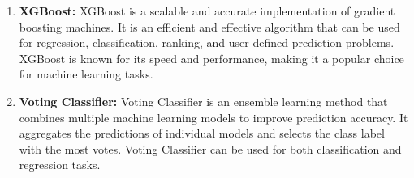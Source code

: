 \documentclass[12pt]{report}
\begin{document}
\begin{enumerate}
\item{\textbf{XGBoost: }}
XGBoost is a scalable and accurate implementation of gradient boosting machines. It is an efficient and effective algorithm that can be used for regression, classification, ranking, and user-defined prediction problems. XGBoost is known for its speed and performance, making it a popular choice for machine learning tasks. \cite{hadsonml}
\item{\textbf{Voting Classifier: }}
Voting Classifier is an ensemble learning method that combines multiple machine learning models to improve prediction accuracy. It aggregates the predictions of individual models and selects the class label with the most votes. Voting Classifier can be used for both classification and regression tasks. \cite{hadsonml}
\end{enumerate}
\end{document}
